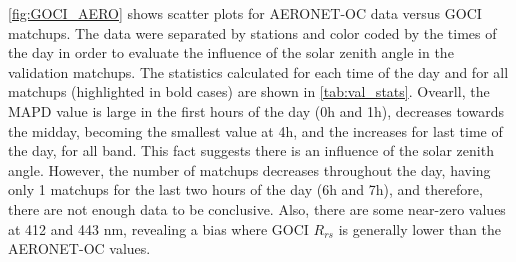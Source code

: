 \documentclass[onecolumn,3p,letterpaper,11pt]{elsarticle}
\begin{document}
\autoref{fig:GOCI_AERO} shows scatter plots for AERONET-OC data versus GOCI matchups. The data were separated by stations and color coded by the times of the day in order to evaluate the influence of the solar zenith angle in the validation matchups. The statistics calculated for each time of the day and for all matchups (highlighted in bold cases) are shown in \autoref{tab:val_stats}. Ovearll, the MAPD value is large in the first hours of the day (0h and 1h), decreases towards the midday, becoming the smallest value at 4h, and the increases for last time of the day, for all band. This fact suggests there is an influence of the solar zenith angle. However, the number of matchups decreases throughout the day, having only 1 matchups for the last two hours of the day (6h and 7h), and therefore, there are not enough data to be conclusive. Also, there are some near-zero values at 412 and 443 nm, revealing a bias where GOCI $R_{rs}$ is generally lower than the AERONET-OC values.
\end{document}
